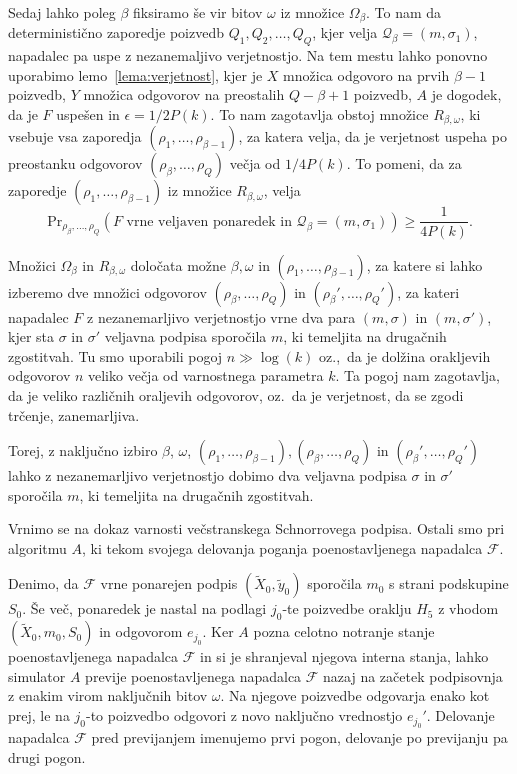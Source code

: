 \documentclass[isrm2, tisk]{fmfdelo}
\begin{document}
\begin{dokaz}
    Sedaj lahko poleg $\beta$ fiksiramo še vir bitov $\omega$ iz množice $\Omega_\beta$. To nam da
    deterministično zaporedje poizvedb $Q_1, Q_2, \dots, Q_Q$, kjer velja $\mathcal{Q}_\beta =
    (m, \sigma_1)$, napadalec pa uspe z nezanemaljivo verjetnostjo. Na tem mestu lahko ponovno
    uporabimo lemo~\ref{lema:verjetnost}, kjer je $X$ množica odgovoro na prvih $\beta - 1$ poizvedb,
    $Y$ množica odgovorov na preostalih $Q - \beta + 1$ poizvedb, $A$ je dogodek, da je $F$ uspešen
    in $\epsilon = 1/2P(k)$. To nam zagotavlja obstoj množice $R_{\beta, \omega}$, ki vsebuje vsa
    zaporedja $(\rho_1, \dots, \rho_{\beta - 1})$, za katera velja, da je verjetnost uspeha po
    preostanku odgovorov $(\rho_\beta, \dots, \rho_Q)$ večja od $1/4P(k)$. To pomeni, da za
    zaporedje $(\rho_1, \dots, \rho_{\beta - 1})$ iz množice $R_{\beta, \omega}$, velja
    $$
    \text{Pr}_{\rho_\beta, \dots, \rho_Q}(\text{$F$ vrne veljaven ponaredek in } \mathcal{Q}_\beta
    = (m, \sigma_1)) \geq \frac{1}{4P(k)}.
    $$

    Množici $\Omega_\beta$ in $R_{\beta, \omega}$ določata možne $\beta, \omega$ in $(\rho_1, \dots,
    \rho_{\beta - 1})$, za katere si lahko izberemo dve množici odgovorov $(\rho_\beta, \dots, \rho_Q)$
    in $(\rho_\beta', \dots, \rho_Q')$, za kateri napadalec $F$ z nezanemarljivo verjetnostjo vrne
    dva para $(m, \sigma)$ in $(m, \sigma')$, kjer sta $\sigma$ in $\sigma'$ veljavna podpisa sporočila
    $m$, ki temeljita na drugačnih zgostitvah. Tu smo uporabili pogoj $n \gg \log(k)$ oz.,\ da je
    dolžina orakljevih odgovorov $n$ veliko večja od varnostnega parametra $k$. Ta pogoj nam zagotavlja,
    da je veliko različnih oraljevih odgovorov, oz.\ da je verjetnost, da se zgodi trčenje,
    zanemarljiva.

    Torej, z naključno izbiro $\beta$, $\omega$, $(\rho_1, \dots, \rho_{\beta - 1}), (\rho_\beta, 
    \dots, \rho_Q)$ in $(\rho_\beta', \dots, \rho_Q')$ lahko z nezanemarljivo verjetnostjo dobimo
    dva veljavna podpisa $\sigma$ in $\sigma'$ sporočila $m$, ki temeljita na drugačnih zgostitvah.
\end{dokaz}

Vrnimo se na dokaz varnosti večstranskega Schnorrovega podpisa. Ostali smo pri algoritmu $A$, ki
tekom svojega delovanja poganja poenostavljenega napadalca $\mathcal{F}$. 

Denimo, da $\mathcal{F}$ vrne ponarejen podpis $(\tilde{X}_0, \tilde{y}_0)$ sporočila $m_0$ s strani
podskupine $S_0$. Še več, ponaredek je nastal na podlagi $j_0$-te poizvedbe oraklju $H_5$ z vhodom
$(\tilde{X}_0, m_0, S_0)$ in odgovorom $e_{j_0}$. Ker $A$ pozna celotno notranje stanje poenostavljenega
napadalca $\mathcal{F}$ in si je shranjeval njegova interna stanja, lahko simulator $A$ previje
poenostavljenega napadalca $\mathcal{F}$ nazaj na začetek podpisovnja z enakim virom naključnih bitov
$\omega$. Na njegove poizvedbe odgovarja enako kot prej, le na $j_0$-to poizvedbo odgovori z novo
naključno vrednostjo $e_{j_0}'$. Delovanje napadalca $\mathcal{F}$ pred previjanjem imenujemo prvi
pogon, delovanje po previjanju pa drugi pogon.
\end{document}
